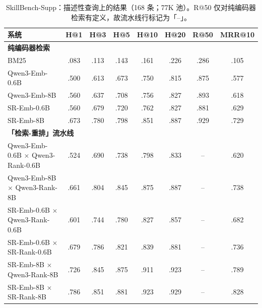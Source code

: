 \documentclass[11pt,UTF8,fontset=fandol]{ctexart}
\begin{document}
\begin{table}[H]\centering
\caption{SkillBench-Supp：描述性查询上的结果（168 条；77K 池）。R@50 仅对纯编码器检索有定义，故流水线行标记为「--」。}
\small
\begin{tabular}{lccccccc}
\toprule
系统 & H@1 & H@3 & H@5 & H@10 & H@20 & R@50 & MRR@10 \\ \midrule
\multicolumn{8}{l}{\textbf{纯编码器检索}} \\
BM25 & .083 & .113 & .143 & .161 & .226 & .286 & .105 \\
Qwen3-Emb-0.6B & .500 & .613 & .673 & .750 & .815 & .875 & .577 \\
Qwen3-Emb-8B & .560 & .637 & .708 & .756 & .827 & .893 & .618 \\
SR-Emb-0.6B & .560 & .679 & .720 & .762 & .827 & .881 & .629 \\
SR-Emb-8B & .673 & .780 & .798 & .851 & .887 & .929 & .729 \\
\multicolumn{8}{l}{\textbf{「检索-重排」流水线}} \\
Qwen3-Emb-0.6B $\times$ Qwen3-Rank-0.6B & .524 & .690 & .738 & .798 & .833 & -- & .620 \\
Qwen3-Emb-8B $\times$ Qwen3-Rank-8B & .661 & .804 & .845 & .875 & .887 & -- & .738 \\
SR-Emb-0.6B $\times$ Qwen3-Rank-0.6B & .601 & .744 & .780 & .827 & .857 & -- & .682 \\
SR-Emb-0.6B $\times$ SR-Rank-0.6B & .679 & .786 & .821 & .839 & .881 & -- & .736 \\
SR-Emb-8B $\times$ Qwen3-Rank-8B & .726 & .845 & .875 & .911 & .923 & -- & .789 \\
SR-Emb-8B $\times$ SR-Rank-8B & .786 & .851 & .881 & .923 & .929 & -- & .828 \\
\bottomrule
\end{tabular}
\label{tab:27}
\end{table}
\end{document}
